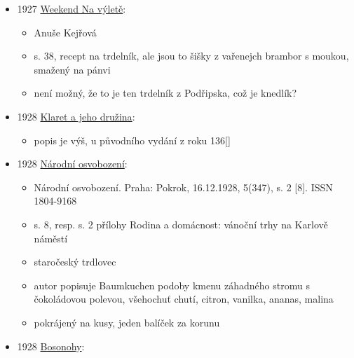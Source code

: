 \begin{itemize}
\begin{itemize}
    \begin{itemize}
    \tightlist
    \item
      Fr. Kropf průvodce po kuhyni české v polovici 18. století
    \item
      koláče na rošti pécti
    \end{itemize}
  \end{itemize}
\item
  1927
  \href{https://ndk.cz/view/uuid:a6e51320-373c-11ee-973a-005056827e51?page=uuid\%3A7905381e-5d69-48f7-97ca-9e0d2c8b5023&fulltext=trdeln\%C3\%ADk}{Weekend
  Na výletě}:

  \begin{itemize}
  \tightlist
  \item
    Anuše Kejřová
  \item
    s. 38, recept na trdelník, ale jsou to šišky z vařenejch brambor s
    moukou, smažený na pánvi
  \item
    není možný, že to je ten trdelník z Podřipska, což je knedlík?
  \end{itemize}
\item
  1928
  \href{https://sources.cms.flu.cas.cz/src/index.php?s=v&bookid=833&page=3}{Klaret
  a jeho družina}:

  \begin{itemize}
  \tightlist
  \item
    popis je výš, u původního vydání z roku 136{[}{]}
  \end{itemize}
\item
  1928
  \href{https://ceskadigitalniknihovna.cz/view/uuid:f80a63e0-611a-11e1-acfb-0013d398622b?page=uuid\%3Ada4abcb0-9dd7-11e7-a093-005056825209&fulltext=trdlovec&source=nkp}{Národní
  osvobození}:

  \begin{itemize}
  \tightlist
  \item
    Národní osvobození. Praha: Pokrok, 16.12.1928, 5(347), s. 2 {[}8{]}.
    ISSN 1804-9168
  \item
    s. 8, resp. s. 2 přílohy Rodina a domácnost: vánoční trhy na Karlově
    náměstí
  \item
    staročeský trdlovec
  \item
    autor popisuje Baumkuchen podoby kmenu záhadného stromu s
    čokoládovou polevou, všehochuť chutí, citron, vanilka, ananas,
    malina
  \item
    pokrájený na kusy, jeden balíček za korunu
  \end{itemize}
\item
  1928
  \href{https://ceskadigitalniknihovna.cz/view/uuid:d9b0f410-125b-11ed-8635-005056827e52?page=uuid\%3A82be2751-0e47-4147-a2f9-395b5608b5ce&fulltext=trdeln\%C3\%ADk\%20OR\%20trdeln\%C3\%ADky\%20OR\%20trdeln\%C3\%ADk\%C5\%AF&source=mzk}{Bosonohy}:


\end{itemize}
